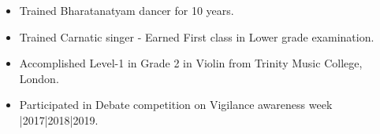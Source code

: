 
\begin{itemize}
    \setlength\itemsep{0.7mm}
    \item Trained Bharatanatyam dancer for 10 years.
    \item Trained Carnatic singer - Earned First class in Lower grade examination.
    \item Accomplished Level-1 in Grade 2 in Violin from Trinity Music College, London.
    \item Participated in Debate competition on Vigilance awareness week |2017|2018|2019.
\end{itemize}
